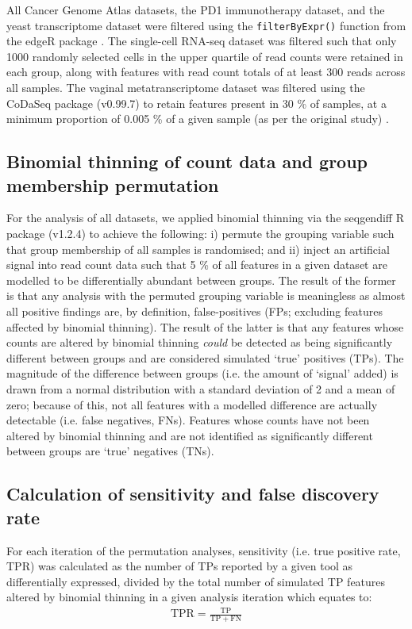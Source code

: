 \documentclass[10pt,letterpaper]{article}
\begin{document}
All Cancer Genome Atlas datasets, the PD1 immunotherapy dataset, and the yeast transcriptome dataset were filtered using the \texttt{filterByExpr()} function from the edgeR package \cite{robinson_edger_2010}. The single-cell RNA-seq dataset was filtered such that only 1000 randomly selected cells in the upper quartile of read counts were retained in each group, along with features with read count totals of at least 300 reads across all samples. The vaginal metatranscriptome dataset was filtered using the CoDaSeq package (v0.99.7) \cite{gloor_codaseq} to retain features present in 30 \% of samples, at a minimum proportion of 0.005 \% of a given sample (as per the original study) \cite{dos_santos_vaginal_2024}.

\subsection*{Binomial thinning of count data and group membership permutation}
For the analysis of all datasets, we applied binomial thinning via the seqgendiff R package (v1.2.4) \cite{gerard_data-based_2020} to achieve the following: i) permute the grouping variable such that group membership of all samples is randomised; and ii) inject an artificial signal into read count data such that 5 \% of all features in a given dataset are modelled to be differentially abundant between groups. The result of the former is that any analysis with the permuted grouping variable is meaningless as almost all positive findings are, by definition, false-positives (FPs; excluding features affected by binomial thinning). The result of the latter is that any features whose counts are altered by binomial thinning \emph{could} be detected as being significantly different between groups and are considered simulated `true' positives (TPs). The magnitude of the difference between groups (i.e. the amount of `signal' added) is drawn from a normal distribution with a standard deviation of 2 and a mean of zero; because of this, not all features with a modelled difference are actually detectable (i.e. false negatives, FNs). Features whose counts have not been altered by binomial thinning and are not identified as significantly different between groups are `true' negatives (TNs).

\subsection*{Calculation of sensitivity and false discovery rate}
For each iteration of the permutation analyses, sensitivity (i.e. true positive rate, TPR) was calculated as the number of TPs reported by a given tool as differentially expressed, divided by the total number of simulated TP features altered by binomial thinning in a given analysis iteration which equates to:
\begin{eqnarray}
	\label{eq:TPR}
	\mathrm{TPR} = \frac{\mathrm{TP}}{\mathrm{TP} + \mathrm{FN}}
 \end{eqnarray}
 
\end{document}
